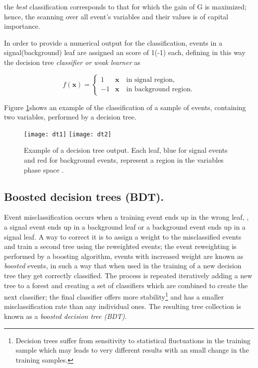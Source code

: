 \noindent the \textit{ best} classification corresponds to that for which the gain of G is maximized; hence, the scanning over all event's variables and their values is of capital importance.

In order to provide a numerical output for the classification, events in a signal(background) leaf are assigned an score of 1(-1) each, defining in this way the decision tree \textit{classifier or weak learner} as

\[
f(\textbf{x}) = \left\{
\begin{array}{ll}
  1  &  \textbf{x} \quad \textrm{in signal region,}\\
  -1 &  \textbf{x} \quad \textrm{in background region.}
\end{array}
\right.
\]

Figure \ref{fig:dtr}shows an example of the classification of a sample of events, containing two variables, performed by a decision tree.

\begin{figure}[!h]
  \centering
  \texttt{[image: dt1]}
  \texttt{[image: dt2]}
  \caption[Decision tree output example.]{Example of a decision tree output. Each leaf, blue for signal events and red for background events, represent a region in the variables phase space \cite{coadou}.}\label{fig:dtr}
\end{figure}

\subsection{Boosted decision trees (BDT).}

Event misclassification occurs when a training event ends up in the wrong leaf, \ie, a signal event ends up in a background leaf or a background event ends up in a signal leaf. A way to correct it is to assign a weight to the misclassified events and train a second tree using the reweighted events; the event reweighting is performed by a boosting algorithm, events with increased weight are known as \textit{boosted} events, in such a way that when used in the training of a new decision tree they get correctly classified. The process is repeated iteratively adding a new tree to a forest and creating a set of classifiers which are combined to create the next classifier; the final classifier offers more stability\footnote{Decision trees suffer from sensitivity to statistical fluctuations in the training sample which may leads to very different results with an small change in the training samples.} and has a smaller misclassification rate than any individual ones. The resulting tree collection is known as a \textit{boosted decision tree (BDT)}.

